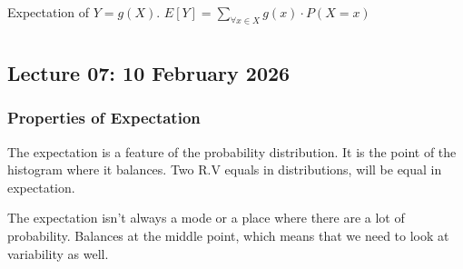 \documentclass{report}
\begin{document}
Expectation of $ Y = g(X) $. $ E[Y] = \sum_{\forall x \in X}^{}g(x) \cdot P(X=x) $  







\chapter{}
\section{Lecture 07: 10 February 2026}
\subsection{Properties of Expectation}

The expectation is a feature of the probability distribution. It is the point of the histogram where it balances. Two R.V equals in distributions, will be equal in expectation. 

The expectation isn't always a mode or a place where there are a lot of probability. Balances at the middle point, which means that we need to look at variability as well. 
\end{document}
